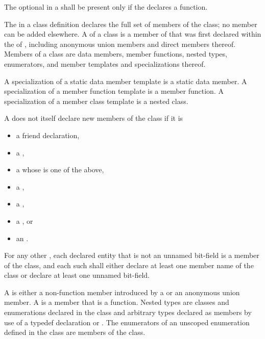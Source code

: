 \pnum
The optional 
in a 
shall be present only if
the  declares a function.

\pnum
{}%
The  in a class definition declares the
full set of members of the class; no member can be added elsewhere.
A  of a class  is a member of 
that was first declared within the  of ,
including anonymous union members and direct members thereof.
Members of a class are data members, member
functions, nested types, enumerators,
and member templates and specializations thereof.
\begin{note}
A specialization of a static data member template is a static data member.
A specialization of a member function template is a member function.
A specialization of a member class template is a nested class.
\end{note}

\pnum
A  does not itself declare new members of the class
if it is
\begin{itemize}
\item a friend declaration,
\item a ,
\item a  whose  is one of the above,
\item a ,
\item a ,
\item a , or
\item an .
\end{itemize}
For any other ,
each declared entity
that is not an unnamed bit-field
is a member of the class,
and each such 
shall either
declare at least one member name of the class
or declare at least one unnamed bit-field.

\pnum
A  is either a non-function member introduced by a
 or an anonymous union member.
A  is a member that is a function.
Nested types are classes and
enumerations declared in the class and arbitrary types
declared as members by use of a typedef declaration
or .
The enumerators of an unscoped enumeration defined in the class
are members of the class.

